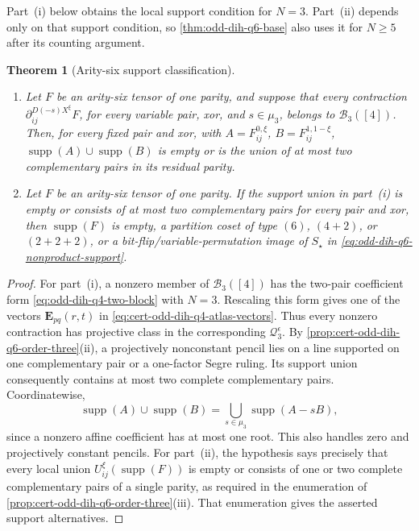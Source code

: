 \documentclass[11pt,letterpaper,onecolumn]{article}
\theoremstyle{plain}
\newtheorem{theorem}{Theorem}[section]
\theoremstyle{definition}
\theoremstyle{remark}
\newcommand{\supp}{\operatorname{supp}}
\begin{document}
	
Part~\textnormal{(i)} below obtains the local support condition for
\(N=3\). Part~\textnormal{(ii)} depends only on that support condition,
so \cref{thm:odd-dih-q6-base} also uses it for \(N\ge5\) after its counting
argument.
    \begin{theorem}[Arity-six support classification]
        \label{thm:cert-odd-dih-q6-interface}
		\begin{enumerate}[label=\textnormal{(\roman*)},leftmargin=*]
			\item Let \(F\) be an arity-six tensor of one parity, and suppose that every
			contraction \(\partial_{ij}^{D(-s)X^\xi}F\), for every variable pair, xor, and
			\(s\in\mu_3\), belongs to \(\mathcal B_3([4])\).
			Then, for every fixed pair and xor, with
			\(A=F_{ij}^{0,\xi}\), \(B=F_{ij}^{1,1-\xi}\),
			\(\supp(A)\cup\supp(B)\) is empty or is the union of at most two
			complementary pairs in its residual parity.
			\item Let \(F\) be an arity-six tensor of one parity.  If the support union
			in part~\textnormal{(i)} is empty or consists of at most two
			complementary pairs for every pair and xor, then \(\supp(F)\) is empty,
			a partition coset of type \((6)\), \((4+2)\), or \((2+2+2)\), or a
			bit-flip/variable-permutation image of \(S_\star\) in
			\cref{eq:odd-dih-q6-nonproduct-support}.
		\end{enumerate}
	\end{theorem}
	
	\begin{proof}
        For part~\textnormal{(i)}, a nonzero member of
        \(\mathcal B_3([4])\) has the two-pair coefficient form
        \eqref{eq:odd-dih-q4-two-block} with \(N=3\). Rescaling this form
        gives one of the vectors \({\mathbf E}_{pq}(r,t)\) in
        \eqref{eq:cert-odd-dih-q4-atlas-vectors}. Thus every nonzero
        contraction has projective class in the corresponding
        \(\mathcal Q_3^\epsilon\). By
		\cref{prop:cert-odd-dih-q6-order-three}\textnormal{(ii)}, a projectively nonconstant
		pencil lies on a line supported on one complementary pair or a one-factor Segre ruling.  Its support
		union consequently contains at most two complete complementary pairs.
		Coordinatewise,
		\[
		\supp(A)\cup\supp(B)=\bigcup_{s\in\mu_3}\supp(A-sB),
		\]
		since a nonzero affine coefficient has at most one root.  This also handles
		zero and projectively constant pencils.  For part~\textnormal{(ii)}, the
		hypothesis says precisely that every local union
		\(U_{ij}^{\xi}(\supp(F))\) is empty or consists of one or two complete
		complementary pairs of a single parity, as required in the enumeration of
		\cref{prop:cert-odd-dih-q6-order-three}\textnormal{(iii)}.  That enumeration
        gives the asserted support alternatives.
	\end{proof}
	
\end{document}
